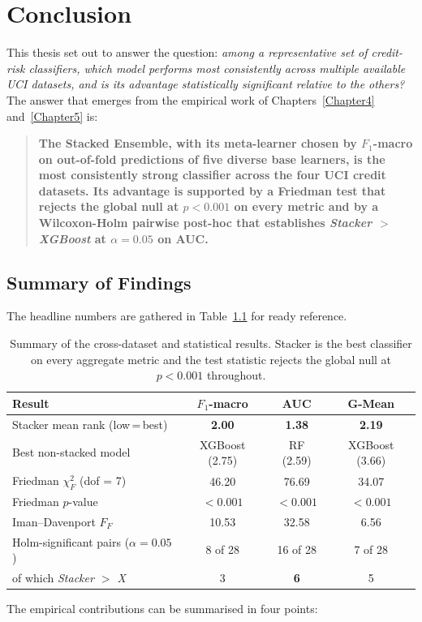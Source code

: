 \chapter{Conclusion}\doublespacing
\label{Chapter6}

This thesis set out to answer the question: \emph{among a
representative set of credit-risk classifiers, which model performs
most consistently across multiple available UCI datasets, and is
its advantage statistically significant relative to the others?}
The answer that emerges from the empirical work of
Chapters~\ref{Chapter4} and~\ref{Chapter5} is:

\begin{quote}
\textbf{The Stacked Ensemble, with its meta-learner chosen by
$F_1$-macro on out-of-fold predictions of five diverse base learners,
is the most consistently strong classifier across the four UCI
credit datasets. Its advantage is supported by a Friedman test
that rejects the global null at $p<0.001$ on every metric and by a
Wilcoxon-Holm pairwise post-hoc that establishes
\emph{Stacker $>$ XGBoost} at $\alpha=0.05$ on AUC.}
\end{quote}

\section{Summary of Findings}
\label{sec:summary}

The headline numbers are gathered in Table~\ref{tab:summary} for ready reference.

\begin{table}[H]
\centering
\caption{Summary of the cross-dataset and statistical results.
Stacker is the best classifier on every aggregate metric and the
test statistic rejects the global null at $p<0.001$ throughout.}
\singlespacing
\label{tab:summary}
\small
\renewcommand{\arraystretch}{1.2}
\begin{tabular}{l c c c}
\toprule
\textbf{Result} & \textbf{$F_1$-macro} & \textbf{AUC} & \textbf{G-Mean}\\
\midrule
Stacker mean rank (low\,=\,best) & \textbf{2.00} & \textbf{1.38} & \textbf{2.19}\\
Best non-stacked model & XGBoost (2.75) & RF (2.59) & XGBoost (3.66)\\
Friedman $\chi^{2}_F$ (dof = 7) & 46.20 & 76.69 & 34.07\\
Friedman $p$-value & $<0.001$ & $<0.001$ & $<0.001$\\
Iman--Davenport $F_F$ & 10.53 & 32.58 & 6.56\\
Holm-significant pairs ($\alpha=0.05$) & 8 of 28 & 16 of 28 & 7 of 28\\
\hspace{4mm}of which \emph{Stacker $>$ X} & 3 & \textbf{6} & 5\\
\bottomrule
\end{tabular}
\end{table}
The empirical contributions can be summarised in four points:

